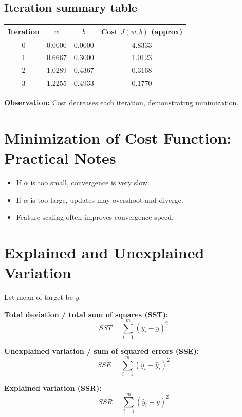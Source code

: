 \documentclass[12pt,a4paper]{article}
\begin{document}
\subsection*{Iteration summary table}
\begin{center}
\begin{tabular}{cccc}
\toprule
Iteration & $w$ & $b$ & Cost $J(w,b)$ (approx) \\
\midrule
0 & 0.0000 & 0.0000 & 4.8333 \\
1 & 0.6667 & 0.3000 & 1.0123 \\
2 & 1.0289 & 0.4367 & 0.3168 \\
3 & 1.2255 & 0.4933 & 0.1770 \\
\bottomrule
\end{tabular}
\end{center}

\textbf{Observation:} Cost decreases each iteration, demonstrating minimization.

\section{\textcolor{primary}{Minimization of Cost Function: Practical Notes}}

\begin{itemize}[noitemsep]
    \item If $\alpha$ is too small, convergence is very slow.
    \item If $\alpha$ is too large, updates may overshoot and diverge.
    \item Feature scaling often improves convergence speed.
\end{itemize}

\section{\textcolor{primary}{Explained and Unexplained Variation}}

Let mean of target be $\bar{y}$.

\textbf{Total deviation / total sum of squares (SST):}
\begin{equation}
SST = \sum_{i=1}^{m}(y_i - \bar{y})^2
\end{equation}

\textbf{Unexplained variation / sum of squared errors (SSE):}
\begin{equation}
SSE = \sum_{i=1}^{m}(y_i - \hat{y}_i)^2
\end{equation}

\textbf{Explained variation (SSR):}
\begin{equation}
SSR = \sum_{i=1}^{m}(\hat{y}_i - \bar{y})^2
\end{equation}
\end{document}
